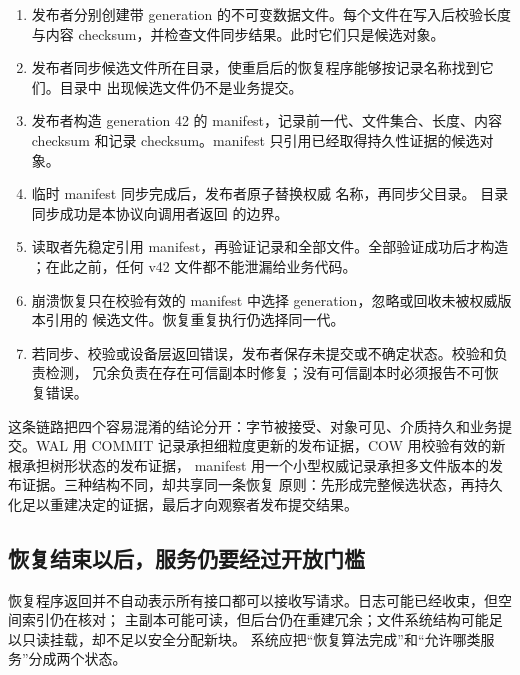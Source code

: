 \begin{enumerate}
\item 发布者分别创建带 generation 的不可变数据文件。每个文件在写入后校验长度与内容
      checksum，并检查文件同步结果。此时它们只是候选对象。
\item 发布者同步候选文件所在目录，使重启后的恢复程序能够按记录名称找到它们。目录中
      出现候选文件仍不是业务提交。
\item 发布者构造 generation 42 的 manifest，记录前一代、文件集合、长度、内容 checksum
      和记录 checksum。manifest 只引用已经取得持久性证据的候选对象。
\item 临时 manifest 同步完成后，发布者原子替换权威  名称，再同步父目录。
      目录同步成功是本协议向调用者返回  的边界。
\item 读取者先稳定引用 manifest，再验证记录和全部文件。全部验证成功后才构造
      ；在此之前，任何 v42 文件都不能泄漏给业务代码。
\item 崩溃恢复只在校验有效的 manifest 中选择 generation，忽略或回收未被权威版本引用的
      候选文件。恢复重复执行仍选择同一代。
\item 若同步、校验或设备层返回错误，发布者保存未提交或不确定状态。校验和负责检测，
      冗余负责在存在可信副本时修复；没有可信副本时必须报告不可恢复错误。
\end{enumerate}

这条链路把四个容易混淆的结论分开：字节被接受、对象可见、介质持久和业务提交。WAL 用
COMMIT 记录承担细粒度更新的发布证据，COW 用校验有效的新根承担树形状态的发布证据，
manifest 用一个小型权威记录承担多文件版本的发布证据。三种结构不同，却共享同一条恢复
原则：先形成完整候选状态，再持久化足以重建决定的证据，最后才向观察者发布提交结果。

\subsection{恢复结束以后，服务仍要经过开放门槛}

恢复程序返回并不自动表示所有接口都可以接收写请求。日志可能已经收束，但空间索引仍在核对；
主副本可能可读，但后台仍在重建冗余；文件系统结构可能足以只读挂载，却不足以安全分配新块。
系统应把“恢复算法完成”和“允许哪类服务”分成两个状态。

